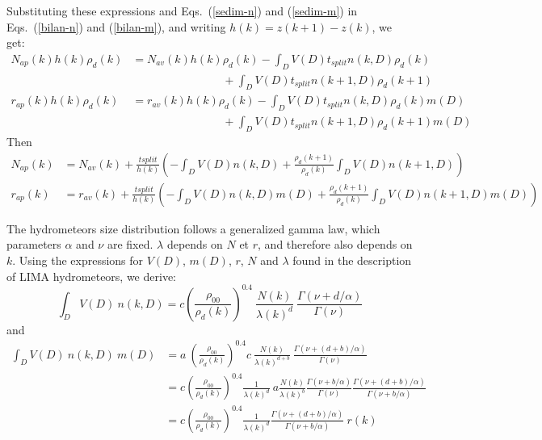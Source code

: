 Substituting these expressions and Eqs.\ (\ref{sedim-n}) and (\ref{sedim-m}) in Eqs.\ (\ref{bilan-n}) and (\ref{bilan-m}), and writing $h(k)=z(k+1)-z(k)$, we get:
\begin{align}
 N_{ap}(k) h(k) \rho_d(k) &= N_{av}(k) h(k) \rho_d(k) %
          - \int_D V(D)t_{split}n(k,D)\rho_d(k) \nonumber \\
          & \qquad \qquad \qquad \qquad + \int_D V(D)t_{split}n(k+1,D)\rho_d(k+1)  \\
 r_{ap}(k) h(k) \rho_d(k) &= r_{av}(k) h(k) \rho_d(k) %
          - \int_D V(D)t_{split}n(k,D)\rho_d(k)m(D) \nonumber \\
          & \qquad \qquad \qquad \qquad + \int_D V(D)t_{split}n(k+1,D)\rho_d(k+1)m(D)
\end{align}
Then
\begin{align}
 \label{evol-N}
 N_{ap}(k)&= N_{av}(k) + \frac{tsplit}{h(k)} \left( %
          - \int_D V(D)n(k,D) %
          + \frac{\rho_d(k+1)}{\rho_d(k)} \int_D V(D)n(k+1,D) \right)  \\
 \label{evol-r}
 r_{ap}(k) &= r_{av}(k)  + \frac{tsplit}{h(k)} \left( %
          - \int_D V(D)n(k,D)m(D) %
          + \frac{\rho_d(k+1)}{\rho_d(k)} \int_D V(D)n(k+1,D)m(D) \right)
\end{align}

The hydrometeors size distribution follows a generalized gamma law, which parameters $\alpha$ and $\nu$ are fixed. $\lambda$ depends on $N$ et $r$, and therefore also depends on $k$. Using the expressions for $V(D)$, $m(D)$, $r$, $N$ and $\lambda$ found in the description of LIMA hydrometeors, we derive:
\begin{equation}
 \int_D V(D)~n(k,D) = c \left(\frac{\rho_{00}}{\rho_d(k)}\right)^{0.4} ~ \frac{N(k)}{\lambda(k)^d}  ~ \frac{\Gamma(\nu+d/\alpha)}{\Gamma(\nu)}
\end{equation}
and
\begin{align}
 \int_D V(D)~n(k,D)~m(D) &= a~\left(\frac{\rho_{00}}{\rho_d(k)}\right)^{0.4} c~\frac{N(k)}{\lambda(k)^{d+b}}~\frac{\Gamma(\nu+(d+b)/\alpha)}{\Gamma(\nu)}   \\
 &= c \left(\frac{\rho_{00}}{\rho_d(k)}\right)^{0.4} \frac{1}{\lambda(k)^d} ~ a \frac{N(k)}{\lambda(k)^b} \frac{\Gamma(\nu+b/\alpha)}{\Gamma(\nu)} \frac{\Gamma(\nu+(d+b)/\alpha)}{\Gamma(\nu+b/\alpha)} \\
 \label{integ-Vnm}
 &= c \left(\frac{\rho_{00}}{\rho_d(k)}\right)^{0.4} \frac{1}{\lambda(k)^d} \frac{\Gamma(\nu+(d+b)/\alpha)}{\Gamma(\nu+b/\alpha)} ~ r(k)
\end{align}

